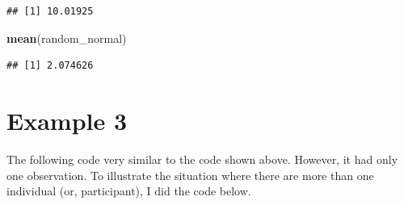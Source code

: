 \documentclass[
]{book}
\newenvironment{Shaded}{\begin{snugshade}}{\end{snugshade}}
\newcommand{\KeywordTok}[1]{\textcolor[rgb]{0.13,0.29,0.53}{\textbf{#1}}}
\newcommand{\NormalTok}[1]{#1}
\begin{document}
\begin{verbatim}
## [1] 10.01925
\end{verbatim}

\begin{Shaded}
\begin{Highlighting}[]
\KeywordTok{mean}\NormalTok{(random_normal)}
\end{Highlighting}
\end{Shaded}

\begin{verbatim}
## [1] 2.074626
\end{verbatim}

\hypertarget{example-3}{%
\section{Example 3}\label{example-3}}

The following code very similar to the code shown above. However, it had only one observation. To illustrate the situation where there are more than one individual (or, participant), I did the code below.
\end{document}
